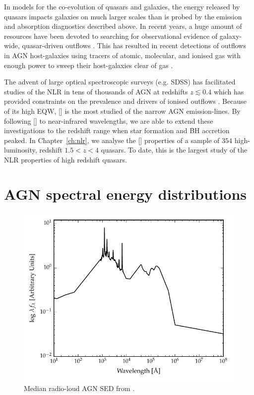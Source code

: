 In models for the co-evolution of quasars and galaxies, the energy released by quasars impacts galaxies on much larger scales than is probed by the emission and absorption diagnostics described above.  
In recent years, a huge amount of resources have been devoted to searching for observational evidence of galaxy-wide, quasar-driven outflows \citep[for recent reviews, see][]{alexander12,fabian12,heckman14}.
This has resulted in recent detections of outflows in AGN host-galaxies using tracers of atomic, molecular, and ionised gas with enough power to sweep their host-galaxies clear of gas \citep[e.g.][]{nesvadba06,arav08,nesvadba08,moe09,dunn10,alexander10,harrison12,harrison14,nesvadba10,rupke13,veilleux13,nardini15,feruglio10,alatalo11,cimatti13,cicone14}.  

The advent of large optical spectroscopic surveys (e.g. SDSS) has facilitated studies of the NLR in tens of thousands of AGN at redshifts $z\lesssim0.4$ which has provided constraints on the prevalence and drivers of ionised outflows \citep[e.g.][]{mullaney13,zakamska14}. 
Because of its high EQW, [] is the most studied of the narrow AGN emission-lines.  
By following [] to near-infrared wavelengths, we are able to extend these investigations to the redshift range when star formation and BH accretion peaked. 
In Chapter~\ref{ch:nlr}, we analyse the [] properties of a sample of $354$ high-luminosity, redshift $1.5 < z < 4$ quasars. 
To date, this is the largest study of the NLR properties of high redshift quasars. 

\section{AGN spectral energy distributions}

\begin{figure}
  \centering
  \includegraphics[width=\textwidth]{figures/chapter05/shangsed.pdf}
  \caption[{Median radio-loud AGN SED.}]{Median radio-loud AGN SED from \citet{shang11}.}
  \label{fig:seyfert_sed}
\end{figure}

